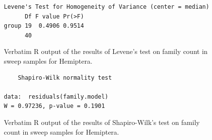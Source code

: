 \documentclass[10pt,letterpaper,twocolumn]{article}
\begin{document}
\begin{figure}[h]
	\lstset{numbers=left}
	\lstset{xleftmargin=5mm,framexleftmargin=5mm}
	\begin{lstlisting}
Levene's Test for Homogeneity of Variance (center = median)
      Df F value Pr(>F)
group 19  0.4906 0.9514
      40               
	\end{lstlisting}
	\caption{Verbatim R output of the results of Levene's test on family count in sweep samples for Hemiptera.}
	\label{fig:sweep_hemiptera_family_levene}
	\smallskip
	\nointerlineskip
	\hrulefill
\end{figure}

\begin{figure}[h]
	\lstset{numbers=left}
	\lstset{xleftmargin=5mm,framexleftmargin=5mm}
	\begin{lstlisting}
	Shapiro-Wilk normality test

data:  residuals(family.model)
W = 0.97236, p-value = 0.1901
	\end{lstlisting}
	\caption{Verbatim R output of the results of Shapiro-Wilk's test on family count in sweep samples for Hemiptera.}
	\label{fig:sweep_hemiptera_family_shapiro}
	\smallskip
	\nointerlineskip
	\hrulefill
\end{figure}
\end{document}
